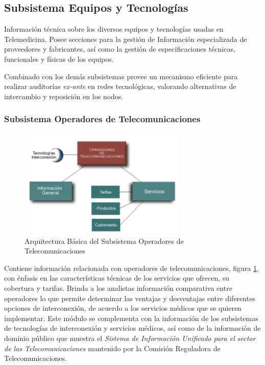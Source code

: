 \subsection{Subsistema Equipos y Tecnologías}
Información técnica sobre los diversos equipos y tecnologías usadas en Telemedicina. Posee secciones para la gestión de Información especializada de proveedores y fabricantes, así como la gestión de especificaciones técnicas, funcionales y físicas de los equipos.

Combinado con los demás subsistemas provee un mecanismo eficiente para realizar auditorías \textit{ex-ante} en redes tecnológicas, valorando alternativas de intercambio y reposición en los nodos.

\subsubsection{Subsistema Operadores de Telecomunicaciones}

\begin{figure}
 \centering
 \includegraphics[width=80mm, height=52mm]{operadores.png}
 \caption{Arquitectura Básica del Subsistema Operadores de Telecomunicaciones}
 \label{operadores}
\end{figure}

Contiene información relacionada con operadores de telecomunicaciones, figura \ref{operadores}, con énfasis en las características técnicas de los servicios que ofrecen, su cobertura y tarifas. Brinda a los analistas información comparativa entre operadores lo que permite determinar las ventajas y desventajas entre diferentes opciones de interconexión, de acuerdo a los servicios médicos que se quieren implementar. Este módulo se complementa con la información de los subsistemas de tecnologías de interconexión y servicios médicos, así como de la información de dominio público que muestra el \textit{Sistema de Información Unificado para el sector de las Telecomunicaciones} mantenido por la Comisión Reguladora de Telecomunicaciones.


